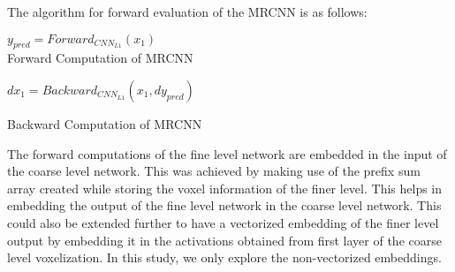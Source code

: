 \documentclass[10pt,letterpaper]{article}
\begin{document}
The algorithm for forward evaluation of the MRCNN is as follows:\\
\begin{minipage}{.49\textwidth}
\begin{algorithm}[H]
	
    $y_{pred} = Forward_{CNN_{L1}}(x_1)$\\
	\caption{Forward Computation of MRCNN}
	\label{Alg:Forward}
\vspace{1.5pt}
\end{algorithm}
\end{minipage}%
\begin{minipage}{.5\textwidth}
\vspace{0pt}  
\begin{algorithm}[H]
    $dx_1 = Backward_{CNN_{L1}}(x_1, dy_{pred})$
	
	\caption{Backward Computation of MRCNN}
	\label{Alg:Backward}
\end{algorithm}
\end{minipage}



The forward computations of the fine level network are embedded in the input of the coarse level network. This was achieved by making use of the prefix sum array created while storing the voxel information of the finer level. This helps in embedding the output of the fine level network in the coarse level network. This could also be extended further to have a vectorized embedding of the finer level output by embedding it in the activations obtained from first layer of the coarse level voxelization. In this study, we only explore the non-vectorized embeddings.

\end{document}
